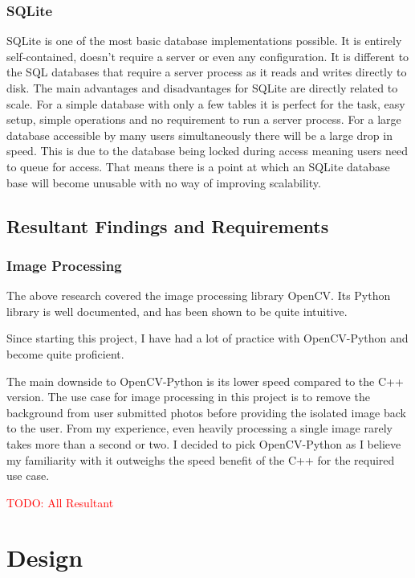 \documentclass[12pt]{article}
\begin{document}
        \subsubsection{SQLite}
SQLite is one of the most basic database implementations possible. It is entirely self-contained, doesn’t require a server or even any configuration. It is different to the SQL databases that require a server process as it reads and writes directly to disk.\bigbreak 
\noindent
The main advantages and disadvantages for SQLite are directly related to scale. For a simple database with only a few tables it is perfect for the task, easy setup, simple operations and no requirement to run a server process. For a large database accessible by many users simultaneously there will be a large drop in speed. This is due to the database being locked during access meaning users need to queue for access. That means there is a point at which an SQLite database base will become unusable with no way of improving scalability.  




    \subsection{Resultant Findings and Requirements}
        \subsubsection{Image Processing}
The above research covered the image processing library OpenCV. Its Python library is well documented, and has been shown to be quite intuitive. 

Since starting this project, I have had a lot of practice with OpenCV-Python and become quite proficient.

The main downside to OpenCV-Python is its lower speed compared to the C++ version. The use case for image processing in this project is to remove the background from user submitted photos before providing the isolated image back to the user. From my experience, even heavily processing a single image rarely takes more than a second or two. I decided to pick OpenCV-Python as I believe my familiarity with it outweighs the speed benefit of the C++ for the required use case.

    \textcolor{red}{TODO: All Resultant}

\section{Design}
\end{document}
